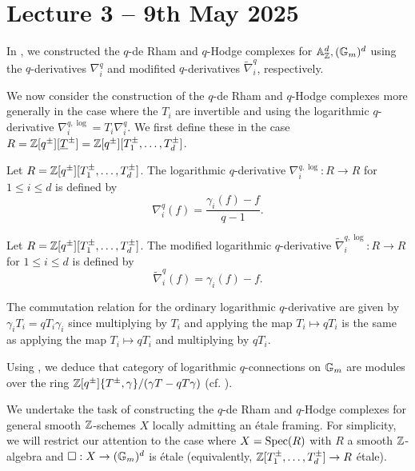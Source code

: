 \section{Lecture 3 -- 9th May 2025}\label{sec: lecture 3}
In , we constructed the $q$-de Rham and $q$-Hodge complexes for $\mathbb{A}^{d}_{\mathbb{Z}},(\mathbb{G}_{m})^{d}$ using the $q$-derivatives $\nabla_{i}^{q}$ and modifited $q$-derivatives $\widetilde{\nabla}_{i}^{q}$, respectively. 

We now consider the construction of the $q$-de Rham and $q$-Hodge complexes more generally in the case where the $T_{i}$ are invertible and using the logarithmic $q$-derivative $\nabla_{i}^{q,\log}=T_{i}\nabla_{i}^{q}$. We first define these in the case $R=\mathbb{Z}[q^{\pm}][\underline{T}^{\pm}]=\mathbb{Z}[q^{\pm}][T_{1}^{\pm},\dots,T_{d}^{\pm}]$. 
\begin{definition}\label{def: logarithmic q-derivative}
    Let $R=\mathbb{Z}[q^{\pm}][T_{1}^{\pm},\dots,T_{d}^{\pm}]$. The logarithmic $q$-derivative $\nabla_{i}^{q,\log}:R\to R$ for $1\leq i\leq d$ is defined by 
    $$\nabla_{i}^{q}(f)=\frac{\gamma_{i}(f)-f}{q-1}.$$
\end{definition}
\begin{definition}\label{def: modified logarithmic q-derivative}
    Let $R=\mathbb{Z}[q^{\pm}][T_{1}^{\pm},\dots,T_{d}^{\pm}]$. The modified logarithmic $q$-derivative $\widetilde{\nabla}_{i}^{q,\log}:R\to R$ for $1\leq i\leq d$ is defined by 
    $$\widetilde{\nabla}_{i}^{q}(f)=\gamma_{i}(f)-f.$$
\end{definition}
\begin{remark}\label{rmk: commutation for log q-connections}
    The commutation relation for the ordinary logarithmic $q$-derivative are given by $\gamma_{i}T_{i}=qT_{i}\gamma_{i}$ since multiplying by $T_{i}$ and applying the map $T_{i}\mapsto qT_{i}$ is the same as applying the map $T_{i}\mapsto qT_{i}$ and multiplying by $qT_{i}$. 
\end{remark}
\begin{example}
    Using , we deduce that category of logarithmic $q$-connections on $\mathbb{G}_{m}$ are modules over the ring $\mathbb{Z}[q^{\pm}]\{T^{\pm},\gamma\}/(\gamma T-q T\gamma)$ (cf. ). 
\end{example}

We undertake the task of constructing the $q$-de Rham and $q$-Hodge complexes for general smooth $\mathbb{Z}$-schemes $X$ locally admitting an \'{e}tale framing. For simplicity, we will restrict our attention to the case where $X=\operatorname{Spec}(R)$ with $R$ a smooth $\mathbb{Z}$-algebra and $\square:X\to(\mathbb{G}_{m})^{d}$ is \'{e}tale (equivalently, $\mathbb{Z}[T_{1}^{\pm},\dots,T_{d}^{\pm}]\to R$ \'{e}tale). 

